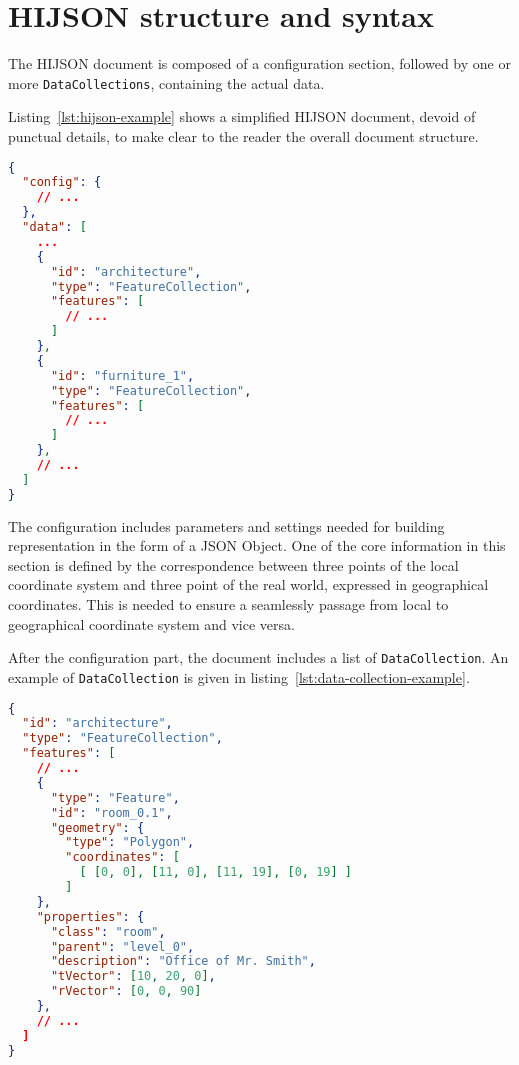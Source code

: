 
\section{HIJSON structure and syntax}\label{hijson-syntax}

The HIJSON document is composed of a configuration section, followed by one or more {\tt DataCollections}, containing the actual data.

Listing~\ref{lst:hijson-example} shows a simplified HIJSON document, devoid of punctual details, to make clear to the reader the overall document structure.


\begin{lstlisting}[language=json, label={lst:hijson-example}, captionpos=b, caption=Example of HIJSON document.]
{
  "config": {
    // ...
  },
  "data": [
    ...
    {
      "id": "architecture",
      "type": "FeatureCollection",
      "features": [
        // ...
      ] 
    },
    {
      "id": "furniture_1",
      "type": "FeatureCollection",
      "features": [
        // ...
      ] 
    },
    // ...
  ]
}
\end{lstlisting}


The configuration includes parameters and settings needed for building representation in the form of a JSON Object. One of the core information in this section is defined by the correspondence between three points of the local coordinate system and three point of the real world, expressed in geographical coordinates. This is needed to ensure a seamlessly passage from local to geographical coordinate system and vice versa.

After the configuration part, the document includes a list of {\tt DataCollection}. An example
of {\tt DataCollection} is given in listing~\ref{lst:data-collection-example}.


\begin{lstlisting}[language=json, label={lst:data-collection-example}, captionpos=b,  caption=Example of {\tt DataCollection}.]
{
  "id": "architecture",
  "type": "FeatureCollection",
  "features": [
    // ...
    {
      "type": "Feature",
      "id": "room_0.1",
      "geometry": {
        "type": "Polygon",
        "coordinates": [ 
          [ [0, 0], [11, 0], [11, 19], [0, 19] ]
        ]
    },
    "properties": {
      "class": "room",
      "parent": "level_0",
      "description": "Office of Mr. Smith",
      "tVector": [10, 20, 0],
      "rVector": [0, 0, 90]
    },
    // ...
  ]
}
\end{lstlisting}

